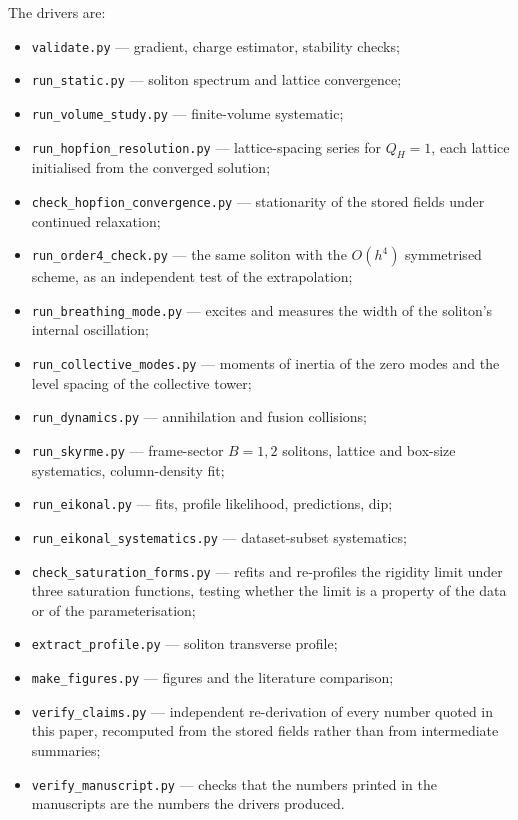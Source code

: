 \documentclass[aps,prd,preprint,nofootinbib,longbibliography]{revtex4-2}
\newcommand{\Qh}{Q_H}
\begin{document}
The drivers are:

\begin{itemize}\itemsep2pt
\item \texttt{validate.py} --- gradient, charge estimator, stability checks;
\item \texttt{run\_static.py} --- soliton spectrum and lattice convergence;
\item \texttt{run\_volume\_study.py} --- finite-volume systematic;
\item \texttt{run\_hopfion\_resolution.py} --- lattice-spacing series for
      $\Qh=1$, each lattice initialised from the converged solution;
\item \texttt{check\_hopfion\_convergence.py} --- stationarity of the stored
      fields under continued relaxation;
\item \texttt{run\_order4\_check.py} --- the same soliton with the $O(h^4)$
      symmetrised scheme, as an independent test of the extrapolation;
\item \texttt{run\_breathing\_mode.py} --- excites and measures the width of the
      soliton's internal oscillation;
\item \texttt{run\_collective\_modes.py} --- moments of inertia of the zero
      modes and the level spacing of the collective tower;
\item \texttt{run\_dynamics.py} --- annihilation and fusion collisions;
\item \texttt{run\_skyrme.py} --- frame-sector $B=1,2$ solitons, lattice and
      box-size systematics, column-density fit;
\item \texttt{run\_eikonal.py} --- fits, profile likelihood, predictions, dip;
\item \texttt{run\_eikonal\_systematics.py} --- dataset-subset systematics;
\item \texttt{check\_saturation\_forms.py} --- refits and re-profiles the
      rigidity limit under three saturation functions, testing whether the limit
      is a property of the data or of the parameterisation;
\item \texttt{extract\_profile.py} --- soliton transverse profile;
\item \texttt{make\_figures.py} --- figures and the literature comparison;
\item \texttt{verify\_claims.py} --- independent re-derivation of every number
      quoted in this paper, recomputed from the stored fields rather than from
      intermediate summaries;
\item \texttt{verify\_manuscript.py} --- checks that the numbers printed in the
      manuscripts are the numbers the drivers produced.
\end{itemize}
\end{document}
